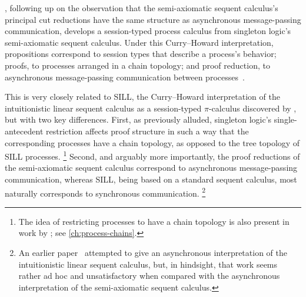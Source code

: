 






, following up on the observation that the semi-axiomatic sequent calculus's principal cut reductions have the same structure as asynchronous message-passing communication, develops a session-typed process calculus from singleton logic's semi-axiomatic sequent calculus.
Under this Curry--Howard interpretation, propositions correspond to session types that describe a process's behavior; proofs, to processes arranged in a chain topology; and proof reduction, to asynchronous message-passing communication between processes~.

This is very closely related to \acs{SILL}, the Curry--Howard interpretation of the intuitionistic linear sequent calculus as a session-typed $\pi$-calculus discovered by \citeauthor{Caires+:MSCS16}\autocites{Caires+Pfenning:CONCUR10}{Caires+:TLDI12}{Caires+:MSCS16}, but with two key differences.
First, as previously alluded, singleton logic's single-antecedent restriction affects proof structure in such a way that the corresponding processes have a chain topology, as opposed to the tree topology of \ac{SILL} processes.%
\footnote{The idea of restricting processes to have a chain topology is also present in work by \textcite{Dezani-Ciancaglini+:PLACES14}; see \cref{ch:process-chains}.}
Second, and arguably more importantly, the proof reductions of the semi-axiomatic sequent calculus correspond to asynchronous message-passing communication, whereas \ac{SILL}, being based on a standard sequent calculus, most naturally corresponds to synchronous communication.%
\footnote{An earlier paper~\parencite{DeYoung+:CSL12} attempted to give an asynchronous interpretation of the intuitionistic linear sequent calculus, but, in hindsight, that work seems rather ad hoc and unsatisfactory when compared with the asynchronous interpretation of the semi-axiomatic sequent calculus.}


